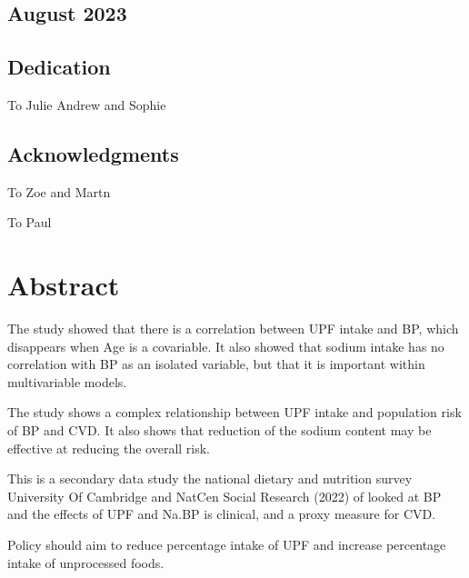 \documentclass[
]{article}
\begin{document}
\hypertarget{august-2023}{%
\subsection*{August 2023}\label{august-2023}}

\newpage

\hypertarget{dedication}{%
\subsection*{Dedication}\label{dedication}}

To Julie Andrew and Sophie

\newpage

\hypertarget{acknowledgments}{%
\subsection*{Acknowledgments}\label{acknowledgments}}

To Zoe and Martn

To Paul

\newpage

\newpage

\hypertarget{abstract}{%
\section*{Abstract}\label{abstract}}

The study showed that there is a correlation between UPF intake and BP,
which disappears when Age is a covariable. It also showed that sodium
intake has no correlation with BP as an isolated variable, but that it
is important within multivariable models.

The study shows a complex relationship between UPF intake and population
risk of BP and CVD. It also shows that reduction of the sodium content
may be effective at reducing the overall risk.

This is a secondary data study the national dietary and nutrition survey
University Of Cambridge and NatCen Social Research (2022) of looked at
BP and the effects of UPF and Na.BP is clinical, and a proxy measure for
CVD.

Policy should aim to reduce percentage intake of UPF and increase
percentage intake of unprocessed foods.

\tableofcontents
\listoffigures
\listoftables
\newpage
\end{document}
